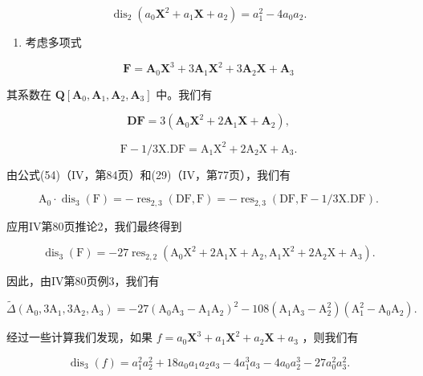\[
\operatorname{dis} _ {2} \left(a _ {0} \mathbf {X} ^ {2} + a _ {1} \mathbf {X} + a _ {2}\right) = a _ {1} ^ {2} - 4 a _ {0} a _ {2}.
\]

\begin{enumerate}
\def\labelenumi{\arabic{enumi})}
\setcounter{enumi}{3}
\tightlist
\item
  考虑多项式
\end{enumerate}

\[
\mathbf {F} = \mathbf {A} _ {0} \mathbf {X} ^ {3} + 3 \mathbf {A} _ {1} \mathbf {X} ^ {2} + 3 \mathbf {A} _ {2} \mathbf {X} + \mathbf {A} _ {3}
\]

其系数在 \(\mathbf{Q}[\mathbf{A}_0,\mathbf{A}_1,\mathbf{A}_2,\mathbf{A}_3]\) 中。我们有

\[
\mathbf {D F} = 3 \left(\mathbf {A} _ {0} \mathbf {X} ^ {2} + 2 \mathbf {A} _ {1} \mathbf {X} + \mathbf {A} _ {2}\right),
\]

\[
\mathrm{F} - 1 / 3 \mathrm{X}. \mathrm{DF} = \mathrm{A} _ {1} \mathrm{X} ^ {2} + 2 \mathrm{A} _ {2} \mathrm{X} + \mathrm{A} _ {3}.
\]

由公式(54)（IV，第84页）和(29)（IV，第77页），我们有

\[
\mathrm{A} _ {0} \cdot \operatorname{dis} _ {3} (\mathrm{F}) = - \operatorname{res} _ {2, 3} (\mathrm{DF}, \mathrm{F}) = - \operatorname{res} _ {2, 3} (\mathrm{DF}, \mathrm{F} - 1 / 3 \mathrm{X}. \mathrm{DF}).
\]

应用IV第80页推论2，我们最终得到

\[
\operatorname{dis} _ {3} (\mathrm{F}) = - 2 7 \operatorname{res} _ {2, 2} \left(\mathrm{A} _ {0} \mathrm{X} ^ {2} + 2 \mathrm{A} _ {1} \mathrm{X} + \mathrm{A} _ {2}, \mathrm{A} _ {1} \mathrm{X} ^ {2} + 2 \mathrm{A} _ {2} \mathrm{X} + \mathrm{A} _ {3}\right).
\]

因此，由IV第80页例3，我们有

\[
\tilde {\Delta} \left(\mathrm{A} _ {0}, 3 \mathrm{A} _ {1}, 3 \mathrm{A} _ {2}, \mathrm{A} _ {3}\right) = - 2 7 \left(\mathrm{A} _ {0} \mathrm{A} _ {3} - \mathrm{A} _ {1} \mathrm{A} _ {2}\right) ^ {2} - 1 0 8 \left(\mathrm{A} _ {1} \mathrm{A} _ {3} - \mathrm{A} _ {2} ^ {2}\right) \left(\mathrm{A} _ {1} ^ {2} - \mathrm{A} _ {0} \mathrm{A} _ {2}\right).
\]

经过一些计算我们发现，如果 \(f = a_0\mathbf{X}^3 + a_1\mathbf{X}^2 + a_2\mathbf{X} + a_3\) ，则我们有

\[
\operatorname{dis} _ {3} (f) = a _ {1} ^ {2} a _ {2} ^ {2} + 1 8 a _ {0} a _ {1} a _ {2} a _ {3} - 4 a _ {1} ^ {3} a _ {3} - 4 a _ {0} a _ {2} ^ {3} - 2 7 a _ {0} ^ {2} a _ {3} ^ {2}.
\]


